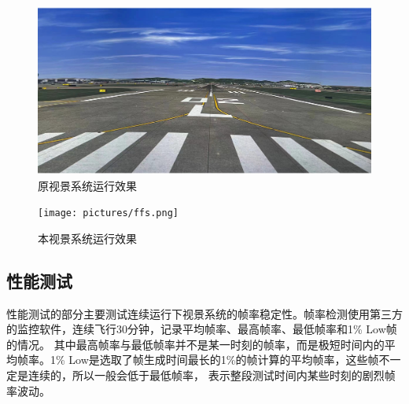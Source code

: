 \begin{figure}[h!]
    \begin{center}
        \includegraphics[width=.8\textwidth]{pictures/ffs2.png}
        \caption{原视景系统运行效果}
        \label{flightffs}
    \end{center}
\end{figure}
\begin{figure}[h!]
    \begin{center}
        \texttt{[image: pictures/ffs.png]}
        \caption{本视景系统运行效果}
        \label{flighttest}
    \end{center}
\end{figure}
\subsection{性能测试}
性能测试的部分主要测试连续运行下视景系统的帧率稳定性。帧率检测使用第三方的监控软件，连续飞行30分钟，记录平均帧率、最高帧率、最低帧率和1\% Low帧的情况。
其中最高帧率与最低帧率并不是某一时刻的帧率，而是极短时间内的平均帧率。1\% Low是选取了帧生成时间最长的1\%的帧计算的平均帧率，这些帧不一定是连续的，所以一般会低于最低帧率，
表示整段测试时间内某些时刻的剧烈帧率波动。

